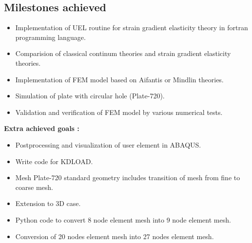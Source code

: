\documentclass[12pt]{article}
\begin{document}
\subsection{Milestones achieved}
\begin{itemize}
	\item Implementation of UEL routine for strain gradient elasticity theory in fortran programming language.
    \item Comparision of classical continum theories and strain gradient elasticity theories.
    \item Implementation of FEM model based on Aifantis or Mindlin theories.
    \item Simulation of plate with circular hole (Plate-720).
    \item Validation and verification of FEM model by various numerical tests.
\end{itemize}
\textbf{Extra achieved goals :}
\begin{itemize}
	\item Postprocessing and visualization of user element in ABAQUS.
	\item Write code for KDLOAD.
	\item Mesh Plate-720 standard geometry includes transition of mesh from fine to coarse mesh.
	\item Extension to 3D case.
	\item Python code to convert 8 node element mesh into 9 node element mesh.
	\item Conversion of 20 nodes element mesh into 27 nodes element mesh.
\end{itemize}
\newpage
\end{document}
